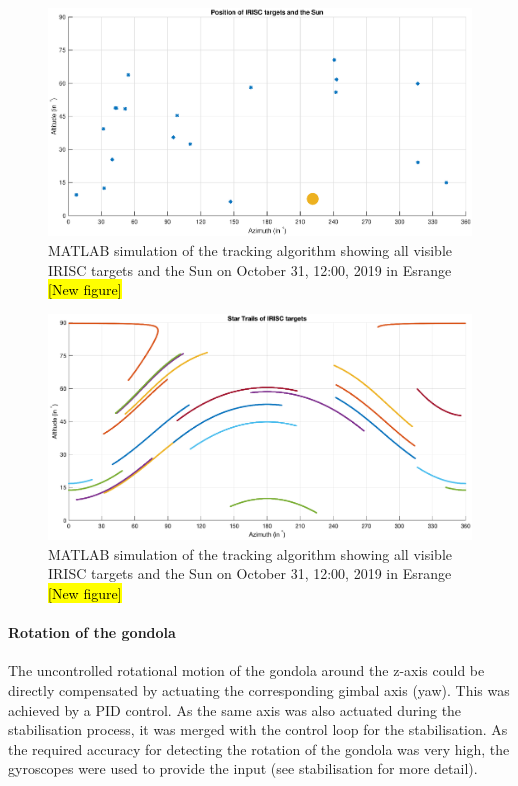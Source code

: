\begin{figure}[htb]
    \centering
    \includegraphics[width = \textwidth]{4-experiment-design/img/software/position_map_31-10-19_12-00.eps}
    \caption{MATLAB simulation of the tracking algorithm showing all visible IRISC targets and the Sun on October 31, 12:00, 2019 in Esrange \hl{[New figure]}}
    \label{fig::software::position_map}
\end{figure}
\begin{figure}[htb]
    \centering
    \includegraphics[width = \textwidth]{4-experiment-design/img/software/star_trails_31-10-19_12-00.eps}
    \caption{MATLAB simulation of the tracking algorithm showing all visible IRISC targets and the Sun on October 31, 12:00, 2019 in Esrange \hl{[New figure]}}
    \label{fig::software::star_trails}
\end{figure}

\paragraph{Rotation of the gondola}

The uncontrolled rotational motion of the gondola around the z-axis could be directly compensated by actuating the corresponding gimbal axis (yaw). This was achieved by a PID control. As the same axis was also actuated during the stabilisation process, it was merged with the control loop for the stabilisation. As the required accuracy for detecting the rotation of the gondola was very high, the gyroscopes were used to provide the input (see stabilisation for more detail).



